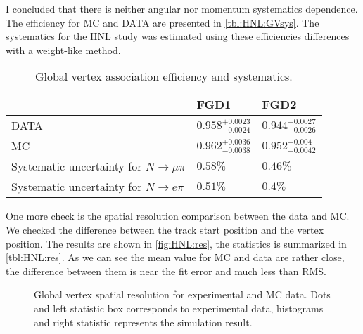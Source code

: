\documentclass[../main.tex]{subfiles}
\begin{document}
I concluded that there is neither angular nor momentum systematics dependence. The efficiency for MC and DATA are presented in \autoref{tbl:HNL:GVsys}. The systematics for the HNL study was estimated using these efficiencies differences with a weight-like method.
\begin{table}[!ht]
\begin{center}
\begin{tabular}{|l|l|l|}
    \hline
    & FGD1 & FGD2 \\
    \hline
    DATA   & $0.958^{+0.0023}_{-0.0024}$ & $0.944^{+0.0027}_{-0.0026}$  \\
    \hline
    MC      & $0.962^{+0.0036}_{-0.0038}$ & $0.952^{+0.004}_{-0.0042}$  \\
    \hline
    Systematic uncertainty for $N\to\mu\pi$ & $0.58\%$ & $0.46\%$ \\
    \hline
    Systematic uncertainty for $N\to e\pi$ & $0.51\%$ & $0.4\%$ \\
    \hline

\end{tabular}
\caption{Global vertex association efficiency and systematics.}
\label{tbl:HNL:GVsys}
\end{center}
\end{table}
One more check is the spatial resolution comparison between the data and MC. We checked the difference between the track start position and the vertex position. The results are shown in \autoref{fig:HNL:res}, the statistics is summarized in \autoref{tbl:HNL:res}. As we can see the mean value for MC and data are rather close, the difference between them is near the fit error and much less than RMS.
\begin{figure}[!ht]
\begin{center}
    \begin{minipage}{0.49\linewidth}
    \end{minipage}
    \hfill
    \begin{minipage}{0.49\linewidth}
    \end{minipage}
    \vfill
    \begin{minipage}{0.49\linewidth}
    \end{minipage}
    \caption{Global vertex spatial resolution for experimental and MC data. Dots and left statistic box corresponds to experimental data, histograms and right statistic represents the simulation result.}
    \label{fig:HNL:res}
\end{center}
\end{figure}
\end{document}

